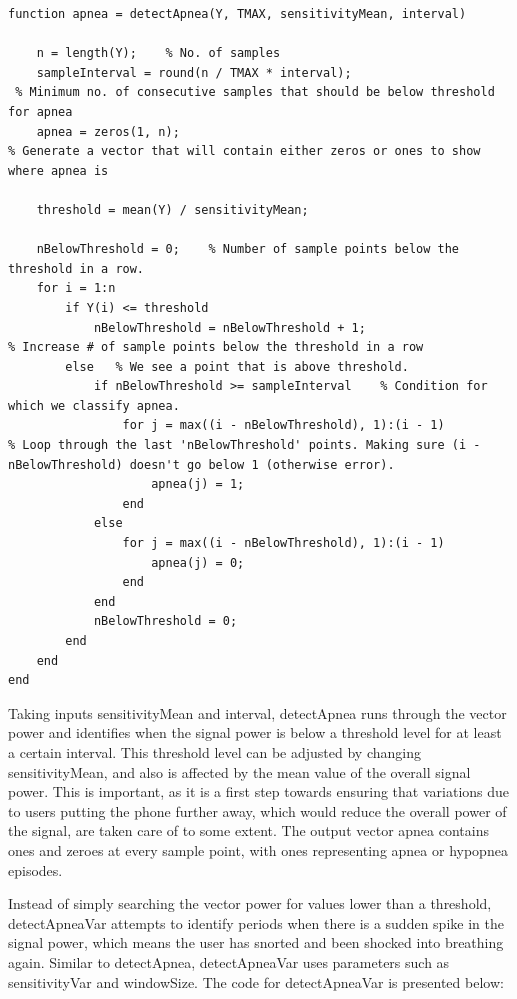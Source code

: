\begin{lstlisting}
function apnea = detectApnea(Y, TMAX, sensitivityMean, interval)

    n = length(Y);    % No. of samples
    sampleInterval = round(n / TMAX * interval);
 % Minimum no. of consecutive samples that should be below threshold for apnea
    apnea = zeros(1, n);
% Generate a vector that will contain either zeros or ones to show where apnea is
    
    threshold = mean(Y) / sensitivityMean;
    
    nBelowThreshold = 0;    % Number of sample points below the threshold in a row.
    for i = 1:n
        if Y(i) <= threshold
            nBelowThreshold = nBelowThreshold + 1;
% Increase # of sample points below the threshold in a row
        else   % We see a point that is above threshold.
            if nBelowThreshold >= sampleInterval    % Condition for which we classify apnea.
                for j = max((i - nBelowThreshold), 1):(i - 1)
% Loop through the last 'nBelowThreshold' points. Making sure (i - nBelowThreshold) doesn't go below 1 (otherwise error).
                    apnea(j) = 1;
                end
            else
                for j = max((i - nBelowThreshold), 1):(i - 1)
                    apnea(j) = 0;
                end
            end
            nBelowThreshold = 0;
        end
    end
end
\end{lstlisting}

Taking inputs sensitivityMean and interval, detectApnea runs through the vector power and identifies when the signal power is below a threshold level for at least a certain interval. This threshold level can be adjusted by changing sensitivityMean, and also is affected by the mean value of the overall signal power. This is important, as it is a first step towards ensuring that variations due to users putting the phone further away, which would reduce the overall power of the signal, are taken care of to some extent. The output vector apnea contains ones and zeroes at every sample point, with ones representing apnea  or hypopnea episodes.

Instead of simply searching the vector power for values lower than a threshold, detectApneaVar attempts to identify periods when there is a sudden spike in the signal power, which means the user has snorted and been shocked into breathing again. Similar to detectApnea, detectApneaVar uses parameters such as sensitivityVar and windowSize. The code for detectApneaVar is presented below:

